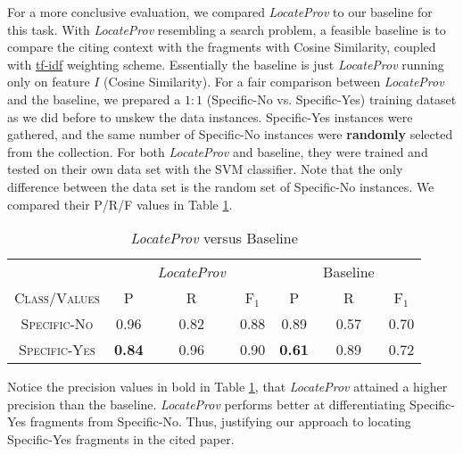 For a more conclusive evaluation, we compared {\it LocateProv} to our baseline for this task. With {\it LocateProv} resembling a search problem, a feasible baseline is to compare the citing context with the fragments with Cosine Similarity, coupled with \url{tf-idf} \cite{irtextbook} weighting scheme. Essentially the baseline is just {\it LocateProv} running only on feature $I$ (Cosine Similarity). For a fair comparison between {\it LocateProv} and the baseline, we prepared a $1:1$ (Specific-No vs. Specific-Yes) training dataset as we did before to unskew the data instances. Specific-Yes instances were gathered, and the same number of Specific-No instances were {\bf randomly} selected from the collection. For both {\it LocateProv} and baseline, they were trained and tested on their own data set with the SVM classifier. Note that the only difference between the data set is the random set of Specific-No instances. We compared their P/R/F values in Table \ref{tab:locateprov_vs_baseline}.

\begin{table}[h]
	\center
	\begin{tabular}{ c | c  c  c | c c c }
		& & {\it LocateProv} & & & Baseline \\
		\textsc{Class/Values} & \textsc{P} & \textsc{R} & \textsc{F$_1$} & \textsc{P} & \textsc{R} & \textsc{F$_1$}  \\
		\hline
		\textsc{Specific-No} 			& 0.96  &    0.82   &   0.88 & 0.89   &   0.57   &   0.70 \\
		\textsc{Specific-Yes} 			& {\bf 0.84}  &    0.96   &   0.90 & {\bf 0.61}   &   0.89   &   0.72 \\
	\end{tabular}
	\caption{{\it LocateProv} versus Baseline}
	\label{tab:locateprov_vs_baseline}
\end{table}
Notice the precision values in bold in Table \ref{tab:locateprov_vs_baseline}, that {\it LocateProv} attained a higher precision than the baseline. {\it LocateProv} performs better at differentiating Specific-Yes fragments from Specific-No. Thus, justifying our approach to locating Specific-Yes fragments in the cited paper.
